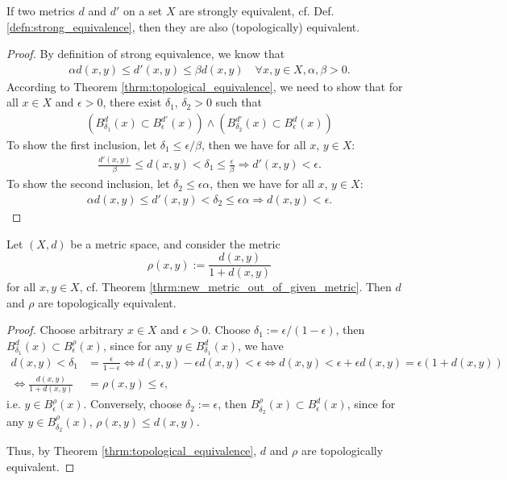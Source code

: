 \begin{theorem}
	If two metrics $d$ and $d'$ on a set $X$ are strongly equivalent, cf. Def. \ref{defn:strong_equivalence}, then they are also (topologically) equivalent.
\end{theorem}

\begin{proof}\cite{1379634}
	By definition of strong equivalence, we know that 
	\begin{align}
		\alpha d(x, y) \leq d'(x, y) \leq \beta d(x, y) \quad\forall x, y\in X, \alpha, \beta > 0.
	\end{align}
	According to Theorem \ref{thrm:topological_equivalence}, we need to show that for all $x\in X$ and $\epsilon > 0$, there exist $\delta_1$, $\delta_2 > 0$ such that 
	\begin{align}
		\left(B_{\delta_1}^{d}(x) \subset B_{\epsilon}^{d'}(x)\right) \wedge \left(B^{d'}_{\delta_2}(x) \subset B^{d}_{\epsilon}(x)\right)
	\end{align}
	To show the first inclusion, let $\delta_1 \leq \epsilon/\beta$, then we have for all $x$, $y\in X$:
	\begin{align}
		\frac{d'(x, y)}{\beta} \leq d(x, y) < \delta_1 \leq \frac{\epsilon}{\beta} \Rightarrow d'(x, y) < \epsilon.
	\end{align}
	To show the second inclusion, let $\delta_2 \leq \epsilon\alpha$, then we have for all $x$, $y\in X$:
	\begin{align}
		\alpha d(x, y)\leq d'(x, y) < \delta_2 \leq \epsilon\alpha \Rightarrow d(x, y) < \epsilon.
	\end{align}
\end{proof}

\begin{theorem}\label{thrm:new_metric_top_equivalent}
	Let $(X, d)$ be a metric space, and consider the metric $$\rho(x, y) := \frac{d(x, y)}{1 + d(x, y)} $$ for all $x, y\in X$, cf. Theorem \ref{thrm:new_metric_out_of_given_metric}. Then $d$ and $\rho$ are topologically equivalent.
\end{theorem}

\begin{proof}
	Choose arbitrary $x\in X$ and $\epsilon > 0$. Choose $\delta_1 := \epsilon/(1 - \epsilon)$, then $B_{\delta_1}^{d}(x) \subset B_{\epsilon}^{\rho}(x)$, since for any $y\in B_{\delta_1}^{d}(x)$, we have 
	\begin{align*}
		d(x, y) < \delta_1 &= \frac{\epsilon}{1 - \epsilon} \Leftrightarrow d(x, y) - \epsilon d(x, y) < \epsilon \Leftrightarrow d(x, y) < \epsilon + \epsilon d(x, y) = \epsilon (1 + d(x, y))
		\\ \Leftrightarrow \frac{d(x, y)}{1 + d(x, y)} &= \rho(x, y) \leq \epsilon,
	\end{align*}
	i.e. $y\in B_{\epsilon}^{\rho}(x)$. Conversely, choose $\delta_2 := \epsilon$, then $B_{\delta_2}^{\rho}(x) \subset B_{\epsilon}^{d}(x)$, since for any $y\in B_{\delta_2}^{\rho}(x)$, $\rho(x, y) \leq d(x, y)$.
	
	Thus, by Theorem \ref{thrm:topological_equivalence}, $d$ and $\rho$ are topologically equivalent.
\end{proof}

